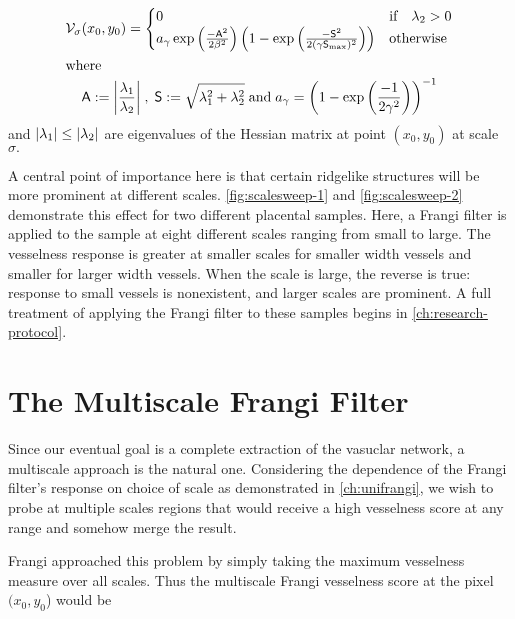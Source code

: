     \begin{gather} \label{eq:Vsigma}
    \Vsigma(x_0,y_0) = \begin{cases}
    0 & \text{if} \quad \lambda_2 > 0 \\
    a_\gamma \exp\left(\frac{-\Am^2}{2\beta^2}\right)
    \left(1 - \exp\left(\frac{-\Sm^2}{2(\gamma \Smax)^2}\right)\right) & \text{otherwise}
    \end{cases} \\
    \shortintertext{where}
    \Am := \abs*{\frac{\lambda_1}{\lambda_2}}
    \;,\;
    \Sm := \sqrt{\lambda_1^2 + \lambda_2^2}
    \;\textrm{and}\;
    a_\gamma = \left(1-\exp\left(\frac{-1}{2\gamma^2}\right)\right)^{-1} \notag\\
    \end{gather}
    and $\abs*{\lambda_1} \le \abs*{\lambda_2}$
    are eigenvalues of the Hessian matrix at point $(x_0, y_0)$ at scale $\sigma.$

    A central point of importance here is that certain ridgelike structures will be more prominent at different scales. \cref{fig:scalesweep-1} and \cref{fig:scalesweep-2} demonstrate this effect for two different placental samples. Here, a Frangi filter is applied to the sample at eight different scales ranging from small to large. The vesselness response is greater at smaller scales for smaller width vessels and smaller for larger width vessels. When the scale is large, the reverse is true: response to small vessels is nonexistent, and larger scales are prominent.  A full treatment of applying the Frangi filter to these samples begins in \cref{ch:research-protocol}.
    
    \section{The Multiscale Frangi Filter}
    Since our eventual goal is a complete extraction of the vasuclar network, a multiscale approach is the natural one. Considering the dependence of the Frangi filter's response on choice of scale as demonstrated in \cref{ch:unifrangi}, we wish to probe at multiple scales
   regions that would receive a high vesselness score at any range and somehow merge the result.
   
    Frangi \cite{frangi-paper} approached this problem by simply taking the maximum vesselness measure over all scales. Thus the multiscale Frangi vesselness score at the pixel $(x_0, y_0$) would be 
    
